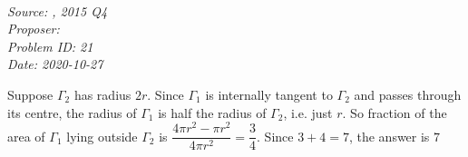 \SSbreak\\
\emph{Source: \Csmc, 2015 Q4}\\
\emph{Proposer: \Pbrain}\\
\emph{Problem ID: 21}\\
\emph{Date: 2020-10-27}\\
\SSbreak

\bigskip

\begin{solution}\hfil\medskip

    Suppose $\Gamma_2$ has radius $2r$. Since $\Gamma_1$ is internally tangent to $\Gamma_2$ and passes through its centre, the radius of $\Gamma_1$ is half the radius of $\Gamma_2$, 
    i.e. just $r$. So fraction of the area of $\Gamma_1$ lying outside $\Gamma_2$ is $\dfrac{4\pi r^2 - \pi r^2}{4 \pi r^2} = \dfrac{3}{4}$. 
    Since $3 + 4 = 7$, the answer is $\boxed{7}$
\end{solution}\bigskip